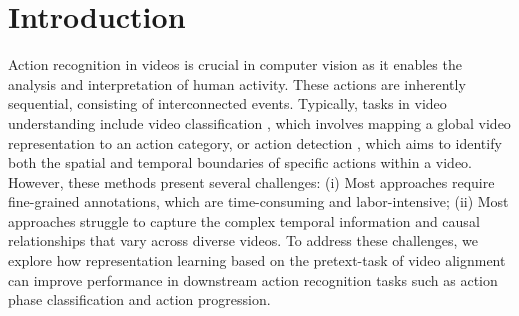 \section{Introduction}

Action recognition in videos is crucial in computer vision as it enables the analysis and interpretation of human activity. These actions are inherently sequential, consisting of interconnected events. Typically, tasks in video understanding include video classification \cite{2014_vc_karpathy, 2014_vc_simonyan, 2017_quovadis, 2020_x3d, 2021_vivit, 2021_videoclass_actionclip}, which involves mapping a global video representation to an action category, or action detection \cite{2017_actiondetect, 2018_videocapsulenet, 2019_slowfast, 2018_bsn, 2022_actionformer}, which aims to identify both the spatial and temporal boundaries of specific actions within a video.
However, these methods present several challenges: (i) Most approaches require fine-grained annotations, which are time-consuming and labor-intensive; (ii) Most approaches struggle to capture the complex temporal information and causal relationships that vary across diverse videos.
To address these challenges, we explore how representation learning based on the pretext-task of video alignment can improve performance in downstream action recognition tasks such as action phase classification and action progression.


